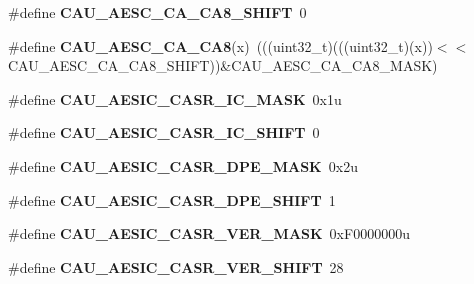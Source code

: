 \begin{DoxyCompactItemize}
\item 
\#define {\bfseries C\+A\+U\+\_\+\+A\+E\+S\+C\+\_\+\+C\+A\+\_\+\+C\+A8\+\_\+\+S\+H\+I\+FT}~0\hypertarget{group__CAU__Register__Masks_ga6498c3198edfe7b02dee8cb187511abb}{}\label{group__CAU__Register__Masks_ga6498c3198edfe7b02dee8cb187511abb}

\item 
\#define {\bfseries C\+A\+U\+\_\+\+A\+E\+S\+C\+\_\+\+C\+A\+\_\+\+C\+A8}(x)~(((uint32\+\_\+t)(((uint32\+\_\+t)(x))$<$$<$C\+A\+U\+\_\+\+A\+E\+S\+C\+\_\+\+C\+A\+\_\+\+C\+A8\+\_\+\+S\+H\+I\+FT))\&C\+A\+U\+\_\+\+A\+E\+S\+C\+\_\+\+C\+A\+\_\+\+C\+A8\+\_\+\+M\+A\+SK)\hypertarget{group__CAU__Register__Masks_ga6fb99abe4a05fc7f273d40ce62d42c3e}{}\label{group__CAU__Register__Masks_ga6fb99abe4a05fc7f273d40ce62d42c3e}

\item 
\#define {\bfseries C\+A\+U\+\_\+\+A\+E\+S\+I\+C\+\_\+\+C\+A\+S\+R\+\_\+\+I\+C\+\_\+\+M\+A\+SK}~0x1u\hypertarget{group__CAU__Register__Masks_gacb80d3117440c08ed94005920ea5fb39}{}\label{group__CAU__Register__Masks_gacb80d3117440c08ed94005920ea5fb39}

\item 
\#define {\bfseries C\+A\+U\+\_\+\+A\+E\+S\+I\+C\+\_\+\+C\+A\+S\+R\+\_\+\+I\+C\+\_\+\+S\+H\+I\+FT}~0\hypertarget{group__CAU__Register__Masks_gaea31527fd7f5ac33f8a4eacdb62ae8bd}{}\label{group__CAU__Register__Masks_gaea31527fd7f5ac33f8a4eacdb62ae8bd}

\item 
\#define {\bfseries C\+A\+U\+\_\+\+A\+E\+S\+I\+C\+\_\+\+C\+A\+S\+R\+\_\+\+D\+P\+E\+\_\+\+M\+A\+SK}~0x2u\hypertarget{group__CAU__Register__Masks_gafd8cf2f0aa0a4475cc5352b023839e02}{}\label{group__CAU__Register__Masks_gafd8cf2f0aa0a4475cc5352b023839e02}

\item 
\#define {\bfseries C\+A\+U\+\_\+\+A\+E\+S\+I\+C\+\_\+\+C\+A\+S\+R\+\_\+\+D\+P\+E\+\_\+\+S\+H\+I\+FT}~1\hypertarget{group__CAU__Register__Masks_ga45aa7619f775385221648659d5303807}{}\label{group__CAU__Register__Masks_ga45aa7619f775385221648659d5303807}

\item 
\#define {\bfseries C\+A\+U\+\_\+\+A\+E\+S\+I\+C\+\_\+\+C\+A\+S\+R\+\_\+\+V\+E\+R\+\_\+\+M\+A\+SK}~0x\+F0000000u\hypertarget{group__CAU__Register__Masks_ga7c4921877f2a358cf58b360ae349d6e4}{}\label{group__CAU__Register__Masks_ga7c4921877f2a358cf58b360ae349d6e4}

\item 
\#define {\bfseries C\+A\+U\+\_\+\+A\+E\+S\+I\+C\+\_\+\+C\+A\+S\+R\+\_\+\+V\+E\+R\+\_\+\+S\+H\+I\+FT}~28\hypertarget{group__CAU__Register__Masks_gac5a230498e5cdfde6c562f568d90acbf}{}\label{group__CAU__Register__Masks_gac5a230498e5cdfde6c562f568d90acbf}


\end{DoxyCompactItemize}
